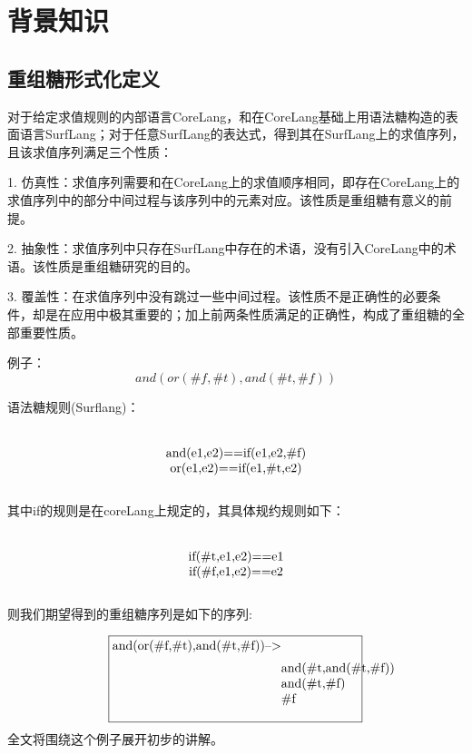 \pagestyle{fancy}
\normalsize
\linespread{1.5}\selectfont
\chapter{背景知识}

\section{重组糖形式化定义}
对于给定求值规则的内部语言CoreLang，和在CoreLang基础上用语法糖构造的表面语言SurfLang；对于任意SurfLang的表达式，得到其在SurfLang上的求值序列，且该求值序列满足三个性质：

1.	仿真性：求值序列需要和在CoreLang上的求值顺序相同，即存在CoreLang上的求值序列中的部分中间过程与该序列中的元素对应。该性质是重组糖有意义的前提。

2.	抽象性：求值序列中只存在SurfLang中存在的术语，没有引入CoreLang中的术语。该性质是重组糖研究的目的。

3.	覆盖性：在求值序列中没有跳过一些中间过程。该性质不是正确性的必要条件，却是在应用中极其重要的；加上前两条性质满足的正确性，构成了重组糖的全部重要性质。

例子：
\begin{equation}
and(or(\#f,\#t),and(\#t,\#f))
\end{equation}

语法糖规则(Surflang)：
\begin{equation}
\parbox[t]{\textwidth}{%
	\begin{center}  
	and(e1,e2)==if(e1,e2,\#f)\\
	or(e1,e2)==if(e1,\#t,e2)
	\end{center}  
}%
\end{equation}


其中if的规则是在coreLang上规定的，其具体规约规则如下：
\begin{equation}
\parbox[t]{\textwidth}{%
	\begin{center}  
	if(\#t,e1,e2)==e1\\
	if(\#f,e1,e2)==e2
	\end{center}  
}%
\end{equation}

则我们期望得到的重组糖序列是如下的序列:

\begin{equation}
\framebox[20em][l]{%
	and(or(\#f,\#t),and(\#t,\#f))-->\parbox[t]{\textwidth}{%
		\begin{flushleft}  
			and(\#t,and(\#t,\#f))\\
			and(\#t,\#f)\\
			\#f
		\end{flushleft}  
	}%
}  
\end{equation}
全文将围绕这个例子展开初步的讲解。

